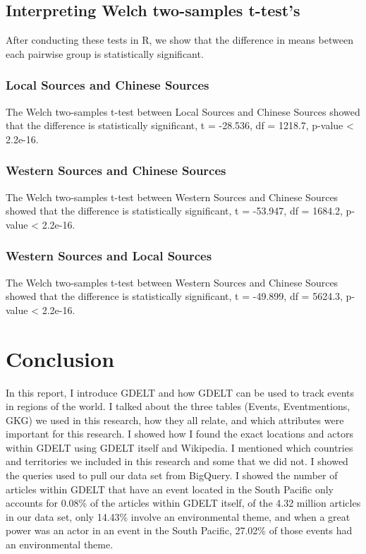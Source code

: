 \documentclass[12pt]{article}
\begin{document}
\subsection*{Interpreting Welch two-samples t-test's}

After conducting these tests in R, we show that the difference in means between each pairwise group is statistically significant. 

\subsubsection*{Local Sources and Chinese Sources}

The Welch two-samples t-test between Local Sources and Chinese Sources showed that the difference is statistically significant, t = -28.536, df = 1218.7, p-value < 2.2e-16. 

\subsubsection*{Western Sources and Chinese Sources}

The Welch two-samples t-test between Western Sources and Chinese Sources showed that the difference is statistically significant, t = -53.947, df = 1684.2, p-value < 2.2e-16.

\subsubsection*{Western Sources and Local Sources}

The Welch two-samples t-test between Western Sources and Chinese Sources showed that the difference is statistically significant, t = -49.899, df = 5624.3, p-value < 2.2e-16.

\section*{Conclusion}

In this report, I introduce GDELT and how GDELT can be used to track events in regions of the world. I talked about the three tables (Events, Eventmentions, GKG) we used in this research, how they all relate, and which attributes were important for this research. I showed how I found the exact locations and actors within GDELT using GDELT itself and Wikipedia. I mentioned which countries and territories we included in this research and some that we did not. I showed the queries used to pull our data set from BigQuery. I showed the number of articles within GDELT that have an event located in the South Pacific only accounts for 0.08\% of the articles within GDELT itself, of the 4.32 million articles in our data set, only 14.43\% involve an environmental theme, and when a great power was an actor in an event in the South Pacific, 27.02\% of those events had an environmental theme. 
\end{document}

